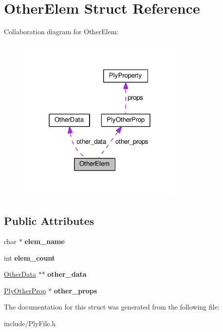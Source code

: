\hypertarget{structOtherElem}{\section{Other\-Elem Struct Reference}
\label{structOtherElem}
}


Collaboration diagram for Other\-Elem\-:\nopagebreak
\begin{figure}[H]
\begin{center}
\leavevmode
\includegraphics[width=235pt]{structOtherElem__coll__graph}
\end{center}
\end{figure}
\subsection*{Public Attributes}
\begin{DoxyCompactItemize}
\item 
\hypertarget{structOtherElem_a86011b3e2b292c7354ff8d39ab6e38f4}{char $\ast$ {\bfseries elem\-\_\-name}}\label{structOtherElem_a86011b3e2b292c7354ff8d39ab6e38f4}

\item 
\hypertarget{structOtherElem_ae94cc7f40247728d5d98971685ff35e3}{int {\bfseries elem\-\_\-count}}\label{structOtherElem_ae94cc7f40247728d5d98971685ff35e3}

\item 
\hypertarget{structOtherElem_a3dec65c2ba1b4c206ac9f3d02ec4b935}{\hyperlink{structOtherData}{Other\-Data} $\ast$$\ast$ {\bfseries other\-\_\-data}}\label{structOtherElem_a3dec65c2ba1b4c206ac9f3d02ec4b935}

\item 
\hypertarget{structOtherElem_aa800ba93c6711ef9da7be0d3cf032263}{\hyperlink{structPlyOtherProp}{Ply\-Other\-Prop} $\ast$ {\bfseries other\-\_\-props}}\label{structOtherElem_aa800ba93c6711ef9da7be0d3cf032263}

\end{DoxyCompactItemize}


The documentation for this struct was generated from the following file\-:\begin{DoxyCompactItemize}
\item 
include/Ply\-File.\-h\end{DoxyCompactItemize}
